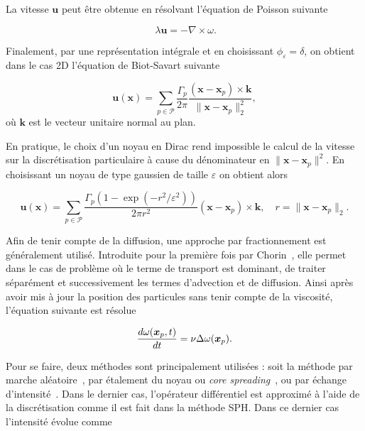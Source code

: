 La vitesse $\bm u$ peut être obtenue en résolvant l'équation de Poisson suivante

\begin{equation*}~\label{eq:poisson}
    \lambda \bm u = - \nabla \times \omega.
\end{equation*}

Finalement, par une représentation intégrale et en choisissant $\phi_\varepsilon = \delta$, on obtient dans le cas 2D l'équation de Biot-Savart suivante

\begin{equation*}
    \bm u(\bm x) = \sum_{p \in \mathcal P} \frac{\Gamma_p}{2\pi} \frac{(\bm x - \bm x_p)\times \bm k}{\|\bm x - \bm x_p\|_2^2},
\end{equation*}où $\bm k$ est le vecteur unitaire normal au plan.

En pratique, le choix d'un noyau en Dirac rend impossible le calcul de la vitesse sur la discrétisation particulaire à cause du dénominateur en ${\|\bm x - \bm x_p\|^2}$. En choisissant un noyau de type gaussien de taille $\varepsilon$ on obtient alors

\begin{equation*}
    \bm u(\bm x) = \sum_{p \in \mathcal P} \frac{\Gamma_p(1 - \exp(-r^2 / \varepsilon^2)) }{2\pi r^2} (\bm x - \bm x_p)\times \bm k, \quad r = \|\bm x - \bm x_p\|_2.
\end{equation*}

Afin de tenir compte de la diffusion, une approche par fractionnement est généralement utilisé. Introduite pour la première fois par Chorin~\cite{chorin_discretization_1973}, elle permet dans le cas de problème où le terme de transport est dominant, de traiter séparément et successivement les termes d'advection et de diffusion. Ainsi après avoir mis à jour la position des particules sans tenir compte de la viscosité, l'équation suivante est résolue

\begin{equation*}
    \frac{d\omega(\bm x_p, t)}{dt} = \nu \Delta \omega(\bm{x}_p).
\end{equation*}

Pour se faire, deux méthodes sont principalement utilisées : soit la méthode par marche aléatoire~\cite{chorin_discretization_1973}, par étalement du noyau ou \textit{core spreading}~\cite{LEONARD1980289}, ou par échange d'intensité~\cite{1989MaCom..53..485D}. Dans le dernier cas, l'opérateur différentiel est approximé à l'aide de la discrétisation comme il est fait dans la méthode SPH. Dans ce dernier cas l'intensité évolue comme

